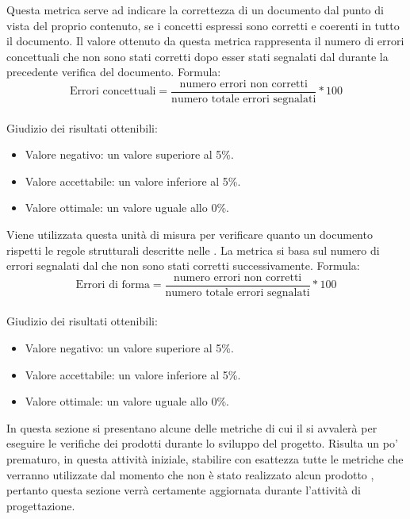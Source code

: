 \documentclass[a4paper, titlepage]{article}
\begin{document}
\label{par:errcon}
Questa metrica serve ad indicare la correttezza di un documento dal punto di vista del proprio contenuto, se i concetti espressi sono corretti e coerenti in tutto il documento.
\newline Il valore ottenuto da questa metrica rappresenta il numero di errori concettuali che non sono stati corretti dopo esser stati segnalati dal  durante la precedente verifica del documento.
\newline Formula:
\begin{displaymath}
\mbox{Errori concettuali}=\frac{\mbox{numero errori non corretti}}{\mbox{numero totale errori segnalati}}*100
\end{displaymath}
\\
\newline Giudizio dei risultati ottenibili:
\begin{itemize}
\item Valore negativo: un valore superiore al 5\%. 
\item Valore accettabile: un valore inferiore al 5\%.
\item Valore ottimale: un valore uguale allo 0\%.
\end{itemize}

\label{par:errfor}
Viene utilizzata questa unità di misura per verificare quanto un documento rispetti le regole strutturali descritte nelle . 
\newline La metrica si basa sul numero di errori segnalati dal  che non sono stati corretti successivamente.
\newline Formula:
\begin{displaymath}
\mbox{Errori di forma}=\frac{\mbox{numero errori non corretti}}{\mbox{numero totale errori segnalati}}*100
\end{displaymath}
\\
\newline Giudizio dei risultati ottenibili:
\begin{itemize}
\item Valore negativo: un valore superiore al 5\%. 
\item Valore accettabile: un valore inferiore al 5\%.
\item Valore ottimale: un valore uguale allo 0\%.
\end{itemize}

In questa sezione si presentano alcune delle metriche di cui il  si avvalerà per eseguire le verifiche dei prodotti  durante lo sviluppo del progetto. Risulta un po' prematuro, in questa attività iniziale, stabilire con esattezza tutte le metriche che verranno utilizzate dal momento che non è stato realizzato alcun prodotto , pertanto questa sezione verrà certamente aggiornata durante l'attività di progettazione. 
\end{document}
